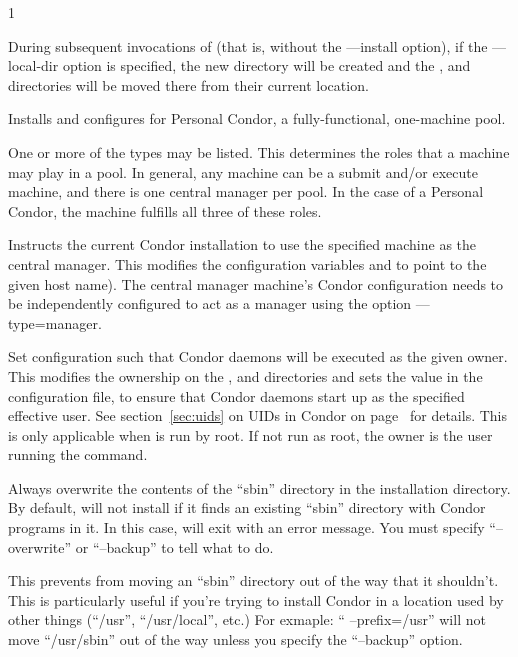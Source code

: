 \begin{ManPage}{\label{man-condor-configure}}{1}
\begin{Options}
{	During subsequent invocations of 
	(that is, without the ---install option),
	if the ---local-dir option is specified, the new directory
	will be created and the ,  and  
	directories will be moved there from their current location.}

	 {Installs and configures for 
	 Personal Condor, a fully-functional, one-machine pool.}

	 {One
	or more of the types may be listed.
	This determines the roles that a machine may play in a pool.
	In general, any machine can be a submit and/or execute machine,
	and there is one central manager per pool.
	In the case of a Personal Condor,
	the machine fulfills all three of these roles.}

	 {Instructs
	the current Condor installation to use the specified machine
	as the central manager. 
	This modifies the configuration variables 
	and  to point to the given host name).
	The central manager machine's Condor configuration needs
	to be independently configured to 
	act as a manager using the option ---type=manager. }

	 {Set configuration
	such that Condor daemons will be executed as the given owner.
	This modifies the 
	ownership on the ,  and 
	directories and sets the  value
	in the configuration file,
	to ensure that Condor daemons start up as the specified effective user.
	See section~\ref{sec:uids} on
        UIDs in Condor on page~\pageref{sec:uids} for details.
	This is only applicable when  is run by root.
	If not run as root, the owner is the user running
	the  command.  }

	 {
	  Always overwrite the contents of the ``sbin'' directory in
	  the installation directory.  By default, 
	  will not install if it finds an existing ``sbin'' directory
	  with Condor programs in it.  In this case, 
	  will exit with an error message.  You must specify
	  ``--overwrite'' or ``--backup'' to tell 
	  what to do.

	  This prevents  from moving an ``sbin''
	  directory out of the way that it shouldn't.  This is
	  particularly useful if you're trying to install Condor in a
	  location used by other things (``/usr'', ``/usr/local'', etc.)
	  For exmaple: `` --prefix=/usr'' will not move
	  ``/usr/sbin'' out of the way unless you specify the
	  ``--backup'' option.

}
\end{Options}
\end{ManPage}
